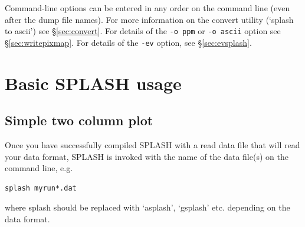 \documentclass[a4paper,10pt]{article}
\newcommand{\splash}{\textsc{SPLASH }}
\begin{document}
 Command-line options can be entered in any order on the command line (even after the dump file names). For more information on the convert utility (`splash to ascii') see \S\ref{sec:convert}. For details of the \verb+-o ppm+ or \verb+-o ascii+ option see \S\ref{sec:writepixmap}. For details of the \verb+-ev+ option, see \S\ref{sec:evsplash}.

\section{Basic \splash usage}
\label{sec:basic}

\subsection{Simple two column plot}
 Once you have successfully compiled \splash with a read data file that will read your data format,
\splash is invoked with the name of the data
file(s) on the command line, e.g.
\begin{verbatim}
splash myrun*.dat
\end{verbatim}
where splash should be replaced with `asplash', `gsplash' etc. depending on the data format. \\
\end{document}
